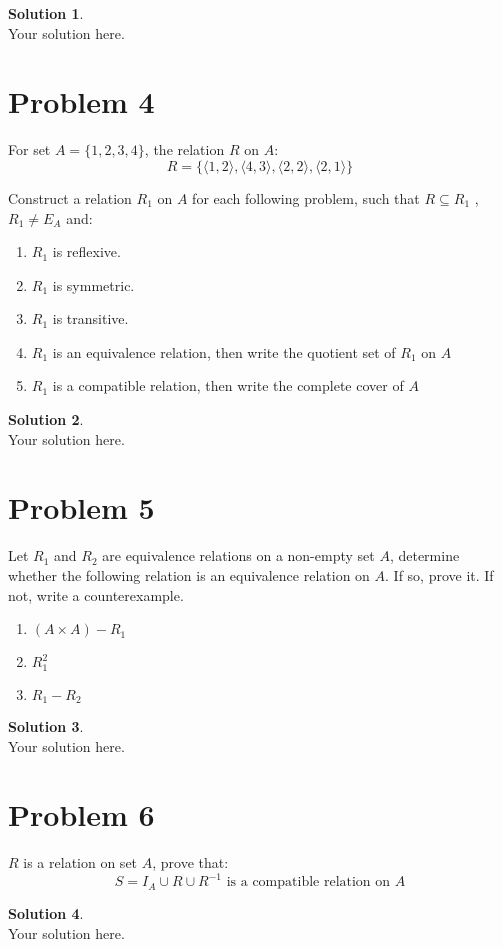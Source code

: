 \documentclass[a4paper,UTF8]{article}
\theoremstyle{definition}
\newtheorem*{solution}{Solution}
\begin{document}
\begin{solution}
	~\\
	Your solution here.
\end{solution}


\section*{Problem 4}
For set $A=\{1,2,3,4\}$, the relation $R$ on $A$:
$$R=\{\langle 1,2 \rangle, \langle 4,3\rangle, \langle 2,2 \rangle, \langle 2,1 \rangle \}$$

Construct a relation $R_1$ on $A$ for each following problem, such that $R\subseteq R_1$ , $R_1\neq E_A$ and:
\begin{enumerate}
	\item $R_1$ is reflexive.
	\item $R_1$ is symmetric.
	\item $R_1$ is transitive.
	\item $R_1$ is an equivalence relation, then write the quotient set of $R_1$ on $A$
	\item $R_1$ is a compatible relation, then write the complete cover of $A$
\end{enumerate}

\begin{solution}
	~\\
	Your solution here.
\end{solution}




\section*{Problem 5}
Let $R_1$ and $R_2$ are equivalence relations on a non-empty set $A$, determine whether the following relation is an equivalence relation on $A$. If so, prove it. If not, write a counterexample.
\begin{enumerate}
	\item $(A\times A) - R_1$
	\item $R_1^2$
	\item $R_1-R_2$
\end{enumerate}

\begin{solution}
	~\\
	Your solution here.
\end{solution}



\section*{Problem 6}
$R$ is a relation on set $A$, prove that:
$$S=I_A\cup R\cup R^{-1} \text{ is a compatible relation on }A$$

\begin{solution}
	~\\
	Your solution here.
\end{solution}
\end{document}
